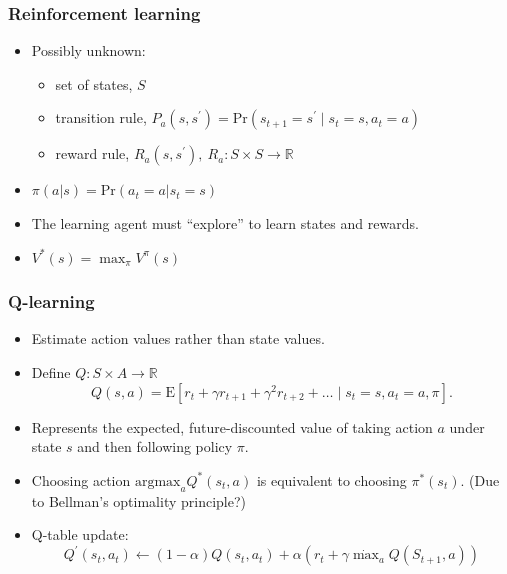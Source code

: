 \documentclass{beamer}
\begin{document}
\begin{frame}
  \frametitle{Reinforcement learning}
  \begin{itemize}
  \item Possibly unknown:
    \begin{itemize}
    \item set of states, \(S\)
    \item transition rule, \(P_a(s,s^\prime)=\text{Pr}(s_{t+1}=s^\prime\mid s_t=s, a_t=a)\)
    \item reward rule, \(R_a(s,s^\prime),\ R_a:S\times S \rightarrow \mathbb{R}\)
    \end{itemize}
  \item \(\pi (a|s)=\text{Pr}(a_{t}=a|s_{t}=s)\)
  \item The learning agent must ``explore'' to learn states and rewards.
  \item \(V^*(s)=\max_\pi V^\pi(s)\)
  \end{itemize}
\end{frame}

\begin{frame}
  \frametitle{Q-learning}
  \begin{itemize}
  \item Estimate action values rather than state values.
  \item Define \(Q:S\times A\rightarrow\mathbb{R}\)
    \begin{equation*}
      Q(s,a) = \text{E}
      \left[
        r_t + \gamma r_{t+1} + \gamma^2 r_{t+2}+\dots\mid s_t=s, a_t=a, \pi
      \right].
    \end{equation*}
  \item Represents the expected, future-discounted value of taking action
    \(a\) under state \(s\) and then following policy \(\pi\).
  \item Choosing action \(\text{argmax}_aQ^*(s_t,a)\) is equivalent to
    choosing \(\pi^*(s_t)\). (Due to Bellman's optimality principle?)
  \item Q-table update:
    \begin{equation*}
      Q^\prime(s_t,a_t) \leftarrow (1-\alpha)Q(s_t,a_t)+\alpha\left(r_t+\gamma\dot\max_aQ(S_{t+1},a)\right)
    \end{equation*}
  \end{itemize}
\end{frame}
\end{document}
